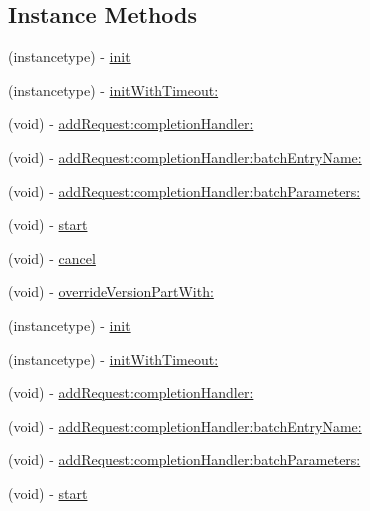 \subsection*{Instance Methods}
\begin{DoxyCompactItemize}
\item 
(instancetype) -\/ \hyperlink{interfaceFBRequestConnection_aaa4ab7062e1647fa4d29964052372363}{init}
\item 
(instancetype) -\/ \hyperlink{interfaceFBRequestConnection_a00435ea153b22e8613108afdbabcadff}{init\+With\+Timeout\+:}
\item 
(void) -\/ \hyperlink{interfaceFBRequestConnection_a751b0603d2cc22be745f33a112681e0d}{add\+Request\+:completion\+Handler\+:}
\item 
(void) -\/ \hyperlink{interfaceFBRequestConnection_a9df3d0f146f9c8caada8ed8402dd7528}{add\+Request\+:completion\+Handler\+:batch\+Entry\+Name\+:}
\item 
(void) -\/ \hyperlink{interfaceFBRequestConnection_abbfd3d7c45f3c3a33a20e093436939e3}{add\+Request\+:completion\+Handler\+:batch\+Parameters\+:}
\item 
(void) -\/ \hyperlink{interfaceFBRequestConnection_a8ddb3ae0c9915b148492678fdbc66a6c}{start}
\item 
(void) -\/ \hyperlink{interfaceFBRequestConnection_aacedf34994dad63d0b6272cfec921889}{cancel}
\item 
(void) -\/ \hyperlink{interfaceFBRequestConnection_a225e5854a3413c22bff120114889ad07}{override\+Version\+Part\+With\+:}
\item 
(instancetype) -\/ \hyperlink{interfaceFBRequestConnection_aaa4ab7062e1647fa4d29964052372363}{init}
\item 
(instancetype) -\/ \hyperlink{interfaceFBRequestConnection_a00435ea153b22e8613108afdbabcadff}{init\+With\+Timeout\+:}
\item 
(void) -\/ \hyperlink{interfaceFBRequestConnection_a751b0603d2cc22be745f33a112681e0d}{add\+Request\+:completion\+Handler\+:}
\item 
(void) -\/ \hyperlink{interfaceFBRequestConnection_a9df3d0f146f9c8caada8ed8402dd7528}{add\+Request\+:completion\+Handler\+:batch\+Entry\+Name\+:}
\item 
(void) -\/ \hyperlink{interfaceFBRequestConnection_abbfd3d7c45f3c3a33a20e093436939e3}{add\+Request\+:completion\+Handler\+:batch\+Parameters\+:}
\item 
(void) -\/ \hyperlink{interfaceFBRequestConnection_a8ddb3ae0c9915b148492678fdbc66a6c}{start}
\item 

\end{DoxyCompactItemize}

